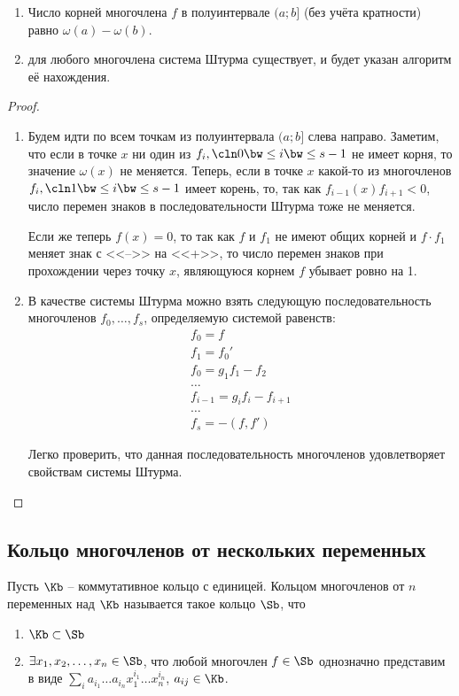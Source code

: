 \begin{theorem}[Штурма]
  \begin{enumerate}
    \item Число корней многочлена $f$ в полуинтервале $(a;b]$ (без учёта кратности) равно $\omega(a)-\omega(b)$.
    \item для любого многочлена система Штурма существует, и будет указан алгоритм её нахождения.
  \end{enumerate}
\end{theorem}
\begin{proof}
  \begin{enumerate}
    \item Будем идти по всем точкам из полуинтервала $(a;b]$ слева направо. Заметим, что если в точке $x$ ни один из $f_i,\cln 0\bw\le i\bw\le s-1$ не имеет корня, то значение $\omega(x)$ не меняется. Теперь, если в точке $x$ какой-то из многочленов $f_i,\cln 1\bw\le i\bw\le s-1$ имеет корень, то, так как $f_{i-1}(x)f_{i+1}<0$, число перемен знаков в последовательности Штурма тоже не меняется.

    Если же теперь $f(x)=0$, то так как $f$ и $f_1$ не имеют общих корней и $f\cdot f_1$ меняет знак с <<-->> на <<+>>, то число перемен знаков при прохождении через точку $x$, являющуюся корнем $f$ убывает ровно на 1.
    \item В качестве системы Штурма можно взять следующую последовательность многочленов $f_0,\dots,f_s$, определяемую системой равенств:
    \begin{gather*}
      f_0 = f\\
      f_1 = f_0'\\
      f_0 = g_1f_1 - f_2\\
      \dots\\
      f_{i-1} = g_if_i - f_{i+1}\\
      \dots\\
      f_s = - (f,f')
    \end{gather*}

    Легко проверить, что данная последовательность многочленов удовлетворяет свойствам системы Штурма.
  \end{enumerate}
\end{proof}

\subsection{Кольцо многочленов от нескольких переменных}

Пусть $\Kb$ -- коммутативное кольцо с единицей. Кольцом многочленов от $n$ переменных над $\Kb$ называется такое кольцо $\Sb$, что
\begin{enumerate}
  \item $\Kb\subset\Sb$
  \item $\exists x_1,x_2,\dots,x_n\in\Sb$, что любой многочлен $f\in\Sb$ однозначно представим в виде $\sum\limits_i a_{i_1}\dots a_{i_n}x_1^{i_1}\dots x_n^{i_n}$, $a_{ij}\in\Kb$.
\end{enumerate}

